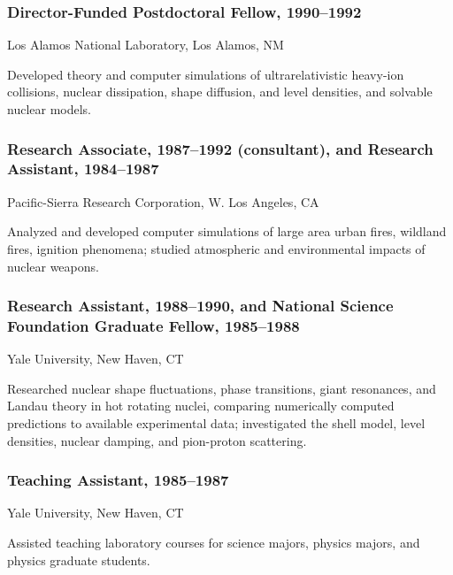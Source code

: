 \documentclass[]{article}
\begin{document}
\subsubsection{Director-Funded Postdoctoral Fellow,
1990--1992}\label{director-funded-postdoctoral-fellow-19901992}

Los Alamos National Laboratory, Los Alamos, NM

Developed theory and computer simulations of ultrarelativistic heavy-ion
collisions, nuclear dissipation, shape diffusion, and level densities,
and solvable nuclear models.

\subsubsection{Research Associate, 1987--1992 (consultant), and Research
Assistant,
1984--1987}\label{research-associate-19871992-consultant-and-research-assistant-19841987}

Pacific-Sierra Research Corporation, W. Los Angeles, CA

Analyzed and developed computer simulations of large area urban fires,
wildland fires, ignition phenomena; studied atmospheric and
environmental impacts of nuclear weapons.

\subsubsection{Research Assistant, 1988--1990, and National Science
Foundation Graduate Fellow,
1985--1988}\label{research-assistant-19881990-and-national-science-foundation-graduate-fellow-19851988}

Yale University, New Haven, CT

Researched nuclear shape fluctuations, phase transitions, giant
resonances, and Landau theory in hot rotating nuclei, comparing
numerically computed predictions to available experimental data;
investigated the shell model, level densities, nuclear damping, and
pion-proton scattering.

\subsubsection{Teaching Assistant,
1985--1987}\label{teaching-assistant-19851987}

Yale University, New Haven, CT

Assisted teaching laboratory courses for science majors, physics majors,
and physics graduate students.
\end{document}
